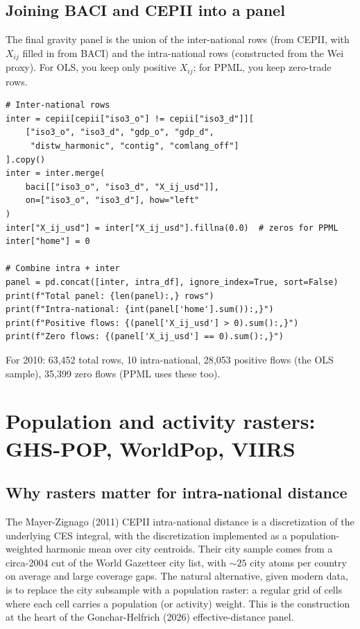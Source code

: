 \documentclass[11pt,letterpaper,oneside]{book}
\theoremstyle{definition}
\theoremstyle{remark}
\begin{document}
\section{Joining BACI and CEPII into a panel}

The final gravity panel is the union of the inter-national rows
(from CEPII, with $X_{ij}$ filled in from BACI) and the intra-national
rows (constructed from the Wei proxy). For OLS, you keep only positive
$X_{ij}$; for PPML, you keep zero-trade rows.

\begin{lstlisting}
# Inter-national rows
inter = cepii[cepii["iso3_o"] != cepii["iso3_d"]][
    ["iso3_o", "iso3_d", "gdp_o", "gdp_d",
     "distw_harmonic", "contig", "comlang_off"]
].copy()
inter = inter.merge(
    baci[["iso3_o", "iso3_d", "X_ij_usd"]],
    on=["iso3_o", "iso3_d"], how="left"
)
inter["X_ij_usd"] = inter["X_ij_usd"].fillna(0.0)  # zeros for PPML
inter["home"] = 0

# Combine intra + inter
panel = pd.concat([inter, intra_df], ignore_index=True, sort=False)
print(f"Total panel: {len(panel):,} rows")
print(f"Intra-national: {int(panel['home'].sum()):,}")
print(f"Positive flows: {(panel['X_ij_usd'] > 0).sum():,}")
print(f"Zero flows: {(panel['X_ij_usd'] == 0).sum():,}")
\end{lstlisting}

For 2010: 63{,}452 total rows, 10 intra-national, 28{,}053 positive flows
(the OLS sample), 35{,}399 zero flows (PPML uses these too).

\chapter{Population and activity rasters: GHS-POP, WorldPop, VIIRS}
\label{ch:rasters}

\section{Why rasters matter for intra-national distance}

The Mayer-Zignago (2011) CEPII intra-national distance is a
discretization of the underlying CES integral, with the discretization
implemented as a population-weighted harmonic mean over city centroids.
Their city sample comes from a circa-2004 cut of the World Gazetteer
city list, with $\sim 25$ city atoms per country on average and large
coverage gaps. The natural alternative, given modern data, is to
replace the city subsample with a population raster: a regular grid
of cells where each cell carries a population (or activity) weight.
This is the construction at the heart of the Gonchar-Helfrich (2026)
effective-distance panel.
\end{document}
